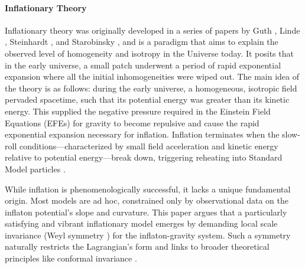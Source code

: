 \documentclass[aps,prd,reprint,preprintnumbers,showpacs,floatfix,nofootinbib,superscript address]{revtex4-2}
\newcommand{\wb}[1]{{\color[RGB]{255,0,0}{\textbf{\textit{[WB: #1]}}}}}
\begin{document}
\paragraph*{Inflationary Theory} Inflationary theory was originally developed in a series of papers by Guth \cite{GuthOriginalPaper}, Linde \cite{LINDE1982389}, Steinhardt 
\cite{PhysRevLett.48.1220}, and Starobinsky \cite{STAROBINSKY198099}, and is a paradigm that aims to explain the observed level of homogeneity and isotropy in the Universe today. It posits that in the early universe, a small patch underwent a period of rapid exponential expansion where all the initial inhomogeneities were wiped out. The main idea of the theory is as follows: during the early universe, a homogeneous, isotropic field pervaded spacetime, such that its potential energy was greater than its kinetic energy. This supplied the negative pressure required in the Einstein Field Equations (EFEs) \cite{einstein1915feldgleichungen} for gravity to become repulsive and cause the rapid exponential expansion necessary for inflation. Inflation terminates when the slow-roll conditions—characterized by small field acceleration and kinetic energy relative to potential energy—break down, triggering reheating into Standard Model particles \cite{Mukhanov:2005sc}.

While inflation is phenomenologically successful, it lacks a unique fundamental origin. Most models are ad hoc, constrained only by observational data on the inflaton potential’s slope and curvature. This paper argues that a particularly satisfying and vibrant inflationary model emerges by demanding local scale invariance (Weyl symmetry \cite{weyl_reine_1918}) for the inflaton-gravity system. Such a symmetry naturally restricts the Lagrangian’s form and links to broader theoretical principles like conformal invariance \cite{francesco_conformal_1997}.

\end{document}
